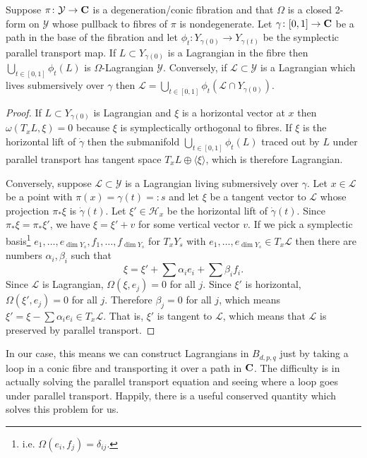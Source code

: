 \documentclass{article}
\begin{document}
\begin{Lemma}\label{lma:spt-lag}
Suppose \(\pi\colon\mathcal{Y}\to\mathbf{C}\) is a degeneration/conic
fibration and that \(\Omega\) is a closed 2-form on \(\mathcal{Y}\)
whose pullback to fibres of \(\pi\) is nondegenerate. Let
\(\gamma\colon[0,1]\to\mathbf{C}\) be a path in the base of the fibration
and let \(\phi_t\colon Y_{\gamma(0)}\to Y_{\gamma(t)}\) be the
symplectic parallel transport map. If \(L\subset Y_{\gamma(0)}\) is
a Lagrangian in the fibre then \(\bigcup_{t\in[0,1]}\phi_t(L)\) is
\(\Omega\)-Lagrangian \(\mathcal{Y}\). Conversely, if
\(\mathcal{L}\subset\mathcal{Y}\) is a Lagrangian which lives
submersively over \(\gamma\) then
\(\mathcal{L}=\bigcup_{t\in[0,1]}\phi_t(\mathcal{L}\cap
Y_{\gamma(0)})\).
\end{Lemma}
\begin{proof}
If \(L\subset Y_{\gamma(0)}\) is Lagrangian and \(\xi\) is a
horizontal vector at \(x\) then \(\omega(T_xL,\xi)=0\) because
\(\xi\) is symplectically orthogonal to fibres. If \(\xi\) is the
horizontal lift of \(\dot{\gamma}\) then the submanifold
\(\bigcup_{t\in[0,1]}\phi_t(L)\) traced out by \(L\) under parallel
transport has tangent space \(T_xL\oplus\langle\xi\rangle\), which
is therefore Lagrangian.


Conversely, suppose \(\mathcal{L}\subset\mathcal{Y}\) is a
Lagrangian living submersively over \(\gamma\). Let
\(x\in\mathcal{L}\) be a point with \(\pi(x)=\gamma(t)=:s\) and let
\(\xi\) be a tangent vector to \(\mathcal{L}\) whose projection
\(\pi_*\xi\) is \(\dot{\gamma}(t)\). Let \(\xi'\in\mathcal{H}_x\) be
the horizontal lift of \(\dot{\gamma}(t)\). Since
\(\pi_*\xi=\pi_*\xi'\), we have \(\xi=\xi'+v\) for some vertical
vector \(v\). If we pick a symplectic
basis\footnote{i.e. \(\Omega(e_i,f_j)=\delta_{ij}\).}
\(e_1,\ldots,e_{\dim Y_s},f_1,\ldots,f_{\dim Y_s}\) for \(T_xY_s\)
with \(e_1,\ldots,e_{\dim Y_s}\in T_x\mathcal{L}\) then there are
numbers \(\alpha_i,\beta_i\) such that
\[\xi=\xi'+\sum\alpha_ie_i+\sum\beta_if_i.\] Since \(\mathcal{L}\)
is Lagrangian, \(\Omega(\xi,e_j)=0\) for all \(j\). Since \(\xi'\)
is horizontal, \(\Omega(\xi',e_j)=0\) for all \(j\). Therefore
\(\beta_j=0\) for all \(j\), which means
\(\xi'=\xi-\sum\alpha_ie_i\in T_x\mathcal{L}\). That is, \(\xi'\) is
tangent to \(\mathcal{L}\), which means that \(\mathcal{L}\) is
preserved by parallel transport. \qedhere


\end{proof}
In our case, this means we can construct Lagrangians in \(B_{d,p,q}\)
just by taking a loop in a conic fibre and transporting it over a path
in \(\mathbf{C}\). The difficulty is in actually solving the parallel
transport equation and seeing where a loop goes under parallel
transport. Happily, there is a useful conserved quantity which solves
this problem for us.
\end{document}
